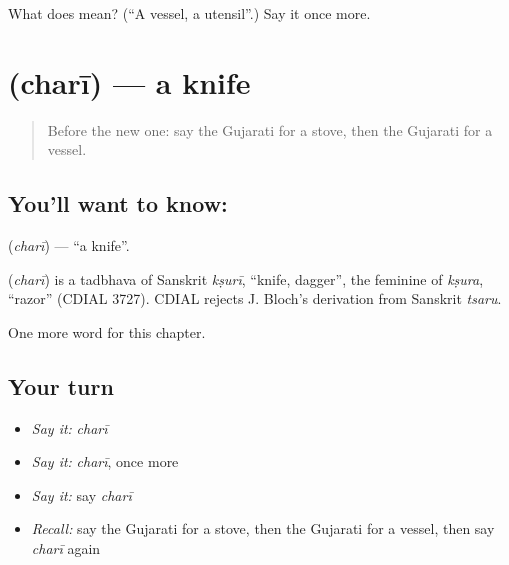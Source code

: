 \begin{tcolorbox}[breakable,colback=teal!4,colframe=teal!35!black,title={Before you move on}]
What does  mean? (\textquotedblleft{}A vessel, a utensil\textquotedblright{}.) Say it once more.
\end{tcolorbox}
\section[\texorpdfstring{\gu{છરી} (charī)}{છરી (charī)}]{ (charī) — a knife}

\label{lesson:GU-C108-chari}



\begin{quote}
Before the new one: say the Gujarati for a stove, then the Gujarati for a vessel.
\end{quote}

\subsection*{You'll want to know: }
\textbf{} (\emph{charī}) — \textquotedblleft{}a knife\textquotedblright{}.

\begin{cousinweb}
\textbf{} (\emph{charī}) is a tadbhava of Sanskrit \emph{kṣurī}, \textquotedblleft{}knife, dagger\textquotedblright{}, the feminine of \emph{kṣura}, \textquotedblleft{}razor\textquotedblright{} (CDIAL 3727). CDIAL rejects J. Bloch's derivation from Sanskrit \emph{tsaru}.
\end{cousinweb}

\begin{grammarlens}[title={What you've built}]
One more word for this chapter.
\end{grammarlens}

\subsection*{Your turn}
\begin{itemize}
\raggedright
  \item \emph{Say it:} \emph{charī}
  \item \emph{Say it:} \emph{charī}, once more
  \item \emph{Say it:} say \emph{charī}
  \item \emph{Recall:} say the Gujarati for a stove, then the Gujarati for a vessel, then say \emph{charī} again
\end{itemize}

